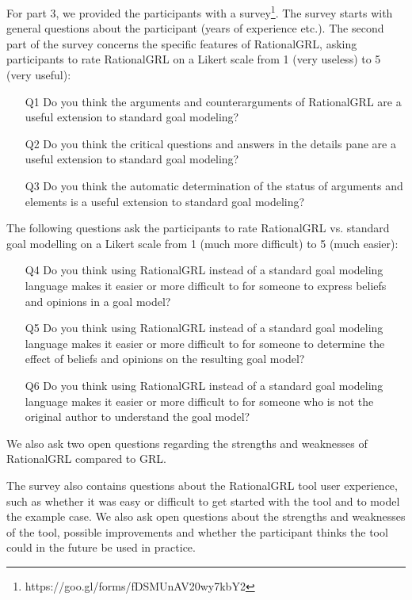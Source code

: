 For part 3, we provided the participants with a survey\footnote{https://goo.gl/forms/fDSMUnAV20wy7kbY2}. The survey starts with general questions about the participant (years of experience etc.). The second part of the survey concerns the specific features of RationalGRL, asking participants to rate RationalGRL on a Likert scale from 1 (very useless) to 5 (very useful):
\begin{itemize}
\item[Q1] Do you think the arguments and counterarguments of RationalGRL are a useful extension to standard goal modeling?
\item[Q2] Do you think the critical questions and answers in the details pane are a useful extension to standard goal modeling?
\item[Q3] Do you think the automatic determination of the status of arguments and elements is a useful extension to standard goal modeling?
\end{itemize}
The following questions ask the participants to rate RationalGRL vs. standard goal modelling on a Likert scale from 1 (much more difficult) to 5 (much easier):
\begin{itemize}
\item[Q4] Do you think using RationalGRL instead of a standard goal modeling language makes it easier or more difficult to for someone to express beliefs and opinions in a goal model?
\item[Q5] Do you think using RationalGRL instead of a standard goal modeling language makes it easier or more difficult to for someone to determine the effect of beliefs and opinions on the resulting goal model?
\item [Q6] Do you think using RationalGRL instead of a standard goal modeling language makes it easier or more difficult to for someone who is not the original author to understand the goal model? 
\end{itemize}
We also ask two open questions regarding the strengths and weaknesses of RationalGRL compared to GRL.

The survey also contains questions about the RationalGRL tool user experience, such as whether it was easy or difficult to get started with the tool and to model the example case. We also ask open questions about the strengths and weaknesses of the tool, possible improvements and whether the participant thinks the tool could in the future be used in practice. 

